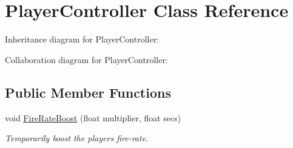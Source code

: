 \hypertarget{class_player_controller}{}\section{Player\+Controller Class Reference}
\label{class_player_controller}


Inheritance diagram for Player\+Controller\+:


Collaboration diagram for Player\+Controller\+:
\subsection*{Public Member Functions}
\begin{DoxyCompactItemize}
\item 
void \mbox{\hyperlink{class_player_controller_aec106145be8e43f9367dd27bd79cbb4b}{Fire\+Rate\+Boost}} (float multiplier, float secs)
\begin{DoxyCompactList}\small\item\em Temporarily boost the player\textquotesingle{}s fire-\/rate. \end{DoxyCompactList}\end{DoxyCompactItemize}
